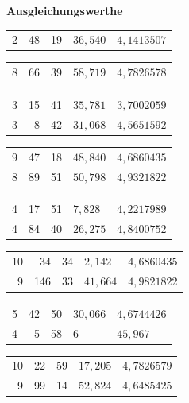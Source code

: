 \documentclass[12pt,a4paper]{article}
\theoremstyle{plain}
\theoremstyle{definition}
\theoremstyle{remark}
\begin{document}
\small
\begin{center}
\textbf{Ausgleichungswerthe}

\medskip

\medskip
\noindent
\begin{tabular}[t]{r|r@{${}^{\circ}$}r@{${}'$}l|l}
  2 & 48 & 19 & $36{,}540$ & $4{,}1413507$ \\
\end{tabular}\hfill\begin{tabular}[t]{r|r@{${}^{\circ}$}r@{${}'$}l|l}
  8 & 66 & 39 & $58{,}719$ & $4{,}7826578$ \\
\end{tabular}

\medskip
\noindent
\begin{tabular}[t]{r|r@{${}^{\circ}$}r@{${}'$}l|l}
  3 & 15 & 41 & $35{,}781$ & $3{,}7002059$ \\
  3 & 8 & 42 & $31{,}068$ & $4{,}5651592$ \\
\end{tabular}\hfill\begin{tabular}[t]{r|r@{${}^{\circ}$}r@{${}'$}l|l}
  9 & 47 & 18 & $48{,}840$ & $4{,}6860435$ \\
  8 & 89 & 51 & $50{,}798$ & $4{,}9321822$ \\
\end{tabular}

\medskip
\noindent
\begin{tabular}[t]{r|r@{${}^{\circ}$}r@{${}'$}l|l}
  4 & 17 & 51 & $7{,}828$ & $4{,}2217989$ \\
  4 & 84 & 40 & $26{,}275$ & $4{,}8400752$ \\
\end{tabular}\hfill\begin{tabular}[t]{r|r@{${}^{\circ}$}r@{${}'$}l|l}
  10 & 34 & 34 & $2{,}142$ & $4{,}6860435$ \\
  9 & 146 & 33 & $41{,}664$ & $4{,}9821822$ \\
\end{tabular}

\medskip
\noindent
\begin{tabular}[t]{r|r@{${}^{\circ}$}r@{${}'$}l|l}
  5 & 42 & 50 & $30{,}066$ & $4{,}6744426$ \\
  4 & 5 & 58 & 6 & $45{,}967$ \\
\end{tabular}\hfill\begin{tabular}[t]{r|r@{${}^{\circ}$}r@{${}'$}l|l}
  10 & 22 & 59 & $17{,}205$ & $4{,}7826579$ \\
  9 & 99 & 14 & $52{,}824$ & $4{,}6485425$ \\
\end{tabular}


\end{center}
\end{document}
